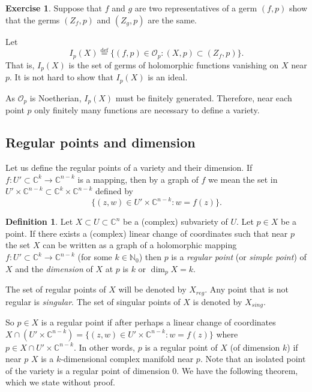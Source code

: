 \documentclass[12pt,openany]{book}
\newcommand{\C}{{\mathbb{C}}}
\newcommand{\N}{{\mathbb{N}}}
\newcommand{\sO}{{\mathcal{O}}}
\newcommand{\myindex}[1]{#1\index{#1}}
\theoremstyle{plain}
\theoremstyle{remark}
\theoremstyle{definition}
\newtheorem{defn}[thm]{Definition}
\theoremstyle{exercise}
\newtheorem{exercise}{Exercise}[section]
\theoremstyle{example}
\begin{document}
\begin{exercise}
Suppose that $f$ and $g$ are two representatives of a germ $(f,p)$
show that the germs $(Z_f,p)$ and $(Z_g,p)$ are the same.
\end{exercise}

Let
\begin{equation}
I_p(X) \overset{\text{def}}{=}
\{ (f,p) \in \sO_p : (X,p) \subset (Z_f,p) \} .
\end{equation}
That is, $I_p(X)$ is the set of germs of holomorphic functions vanishing on
$X$ near $p$.  It is not hard to show that $I_p(X)$ is an ideal.

As $\sO_p$ is Noetherian, $I_p(X)$ must be finitely
generated.  Therefore, near each point $p$ only finitely many functions are
necessary to define a variety.

\subsection{Regular points and dimension}

Let us define the
regular points of a variety and their dimension.
If $f \colon U' \subset \C^k \to \C^{n-k}$ is a mapping, then
by a graph of $f$ we mean the set in $U' \times \C^{n-k} \subset \C^k \times
\C^{n-k}$ defined by
\begin{equation}
\{ (z,w) \in U' \times \C^{n-k} : w=f(z) \} .
\end{equation}

\begin{defn}
Let $X \subset U \subset \C^n$ be a (complex) subvariety of $U$.  Let $p \in X$ be a
point.  If there exists a (complex)
linear change of coordinates such that near
$p$ the set $X$ can be written as a graph of a holomorphic
mapping $f \colon U' \subset \C^k \to
\C^{n-k}$ (for some $k \in \N_0$) then $p$ is a \emph{\myindex{regular point}} (or
\emph{\myindex{simple point}}) of $X$ and
the \emph{dimension}
of $X$ at $p$ is $k$ or $\dim_p X = k$.

The set of regular points of $X$ will be denoted by $X_{\mathit{reg}}$.  Any
point that is not regular is \emph{singular}.
The set of singular points of $X$ is denoted by $X_{\mathit{sing}}$.
\end{defn}

So $p \in X$ is a regular point if after perhaps a linear
change of coordinates $X \cap (U' \times \C^{n-k})
=
\{ (z,w) \in U' \times \C^{n-k} : w=f(z) \}$ where $p \in 
X \cap U' \times \C^{n-k}$.
In other words, $p$ is a regular point of $X$ (of dimension $k$) if near $p$
$X$ is a $k$-dimensional complex manifold near $p$.  Note that
an isolated point of the variety
is a regular point of dimension 0.
We have the following theorem, which we
state without proof.
\end{document}
